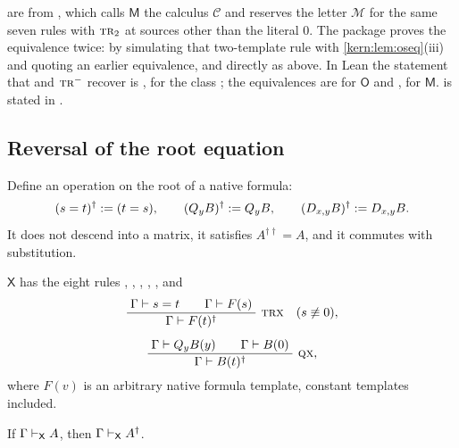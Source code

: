 \begin{remark}[Sources]
\label{kern:rem:onesided-sources}
 are from ,
which calls $\mathsf{M}$ the calculus $\mathcal{C}$ and reserves the letter
$\mathcal{M}$ for the same seven rules with $\rulename{Tr}_{2}$ at sources
other than the literal $0$.  The package proves the equivalence twice: by
simulating that two-template rule with \cref{kern:lem:oseq}(iii) and quoting
an earlier equivalence, and directly as above.  In Lean the statement that
 and $\rulename{Tr}^{-}$ recover  is
, for the class ; the equivalences are
 for $\mathsf{O}$ and ,
 for $\mathsf{M}$.   is
stated in .
\end{remark}

\subsection{Reversal of the root equation}
\label{kern:sec:reversal}

Define an operation on the root of a native formula:
\[
 (s=t)^{\dagger}\mathrel{:=}(t=s),\qquad
 (Q_{y}B)^{\dagger}\mathrel{:=}Q_{y}B,\qquad
 (D_{x,y}B)^{\dagger}\mathrel{:=}D_{x,y}B .
\]
It does not descend into a matrix, it satisfies $A^{\dagger\dagger}=A$, and
it commutes with substitution.

\begin{definition}
\label{kern:def:X}
$\mathsf{X}$ has the eight rules , ,
, , ,  and
\begin{gather*}
 \infrule{\Gamma\proves s=t\qquad\Gamma\proves F(s)}
         {\Gamma\proves F(t)^{\dagger}}\ \rulename{TrX}
 \quad(s\not\equiv 0),
 \\[1.2ex]
 \infrule{\Gamma\proves\Q{y}B(y)\qquad\Gamma\proves B(0)}
         {\Gamma\proves B(t)^{\dagger}}\ \rulename{QX},
\end{gather*}
where $F(v)$ is an arbitrary native formula template, constant templates
included.
\end{definition}

\begin{lemma}[Reversal]
\label{kern:lem:reverse}
If $\Gamma\vdash_{\mathsf{X}}A$, then $\Gamma\vdash_{\mathsf{X}}A^{\dagger}$.
\end{lemma}


